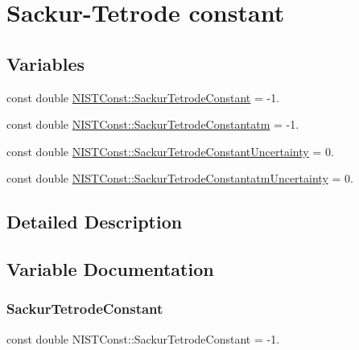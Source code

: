\hypertarget{group___n_i_s_t_const-_sackur_tetrode_constant}{}\section{Sackur-\/\+Tetrode constant}
\label{group___n_i_s_t_const-_sackur_tetrode_constant}
\subsection*{Variables}
\begin{DoxyCompactItemize}
\item 
const double \hyperlink{group___n_i_s_t_const-_sackur_tetrode_constant_gabd9928304da228b5f9c482aa488ea6bd}{N\+I\+S\+T\+Const\+::\+Sackur\+Tetrode\+Constant} = -\/1.
\item 
const double \hyperlink{group___n_i_s_t_const-_sackur_tetrode_constant_ga476418a3565db707ed30de46c3126220}{N\+I\+S\+T\+Const\+::\+Sackur\+Tetrode\+Constantatm} = -\/1.
\item 
const double \hyperlink{group___n_i_s_t_const-_sackur_tetrode_constant_gaddb81f9301bb4f3f7b4e760df5f6e65a}{N\+I\+S\+T\+Const\+::\+Sackur\+Tetrode\+Constant\+Uncertainty} = 0.
\item 
const double \hyperlink{group___n_i_s_t_const-_sackur_tetrode_constant_ga8c5fe541a49c469d78c8d291ceb644c4}{N\+I\+S\+T\+Const\+::\+Sackur\+Tetrode\+Constantatm\+Uncertainty} = 0.
\end{DoxyCompactItemize}


\subsection{Detailed Description}


\subsection{Variable Documentation}
\mbox{\label{group___n_i_s_t_const-_sackur_tetrode_constant_gabd9928304da228b5f9c482aa488ea6bd}} 
\subsubsection{\texorpdfstring{Sackur\+Tetrode\+Constant}{SackurTetrodeConstant}}
{\footnotesize\ttfamily const double N\+I\+S\+T\+Const\+::\+Sackur\+Tetrode\+Constant = -\/1.}

